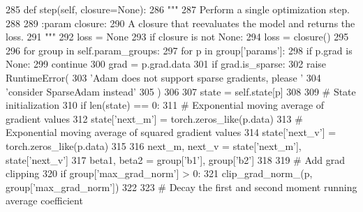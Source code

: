 \begin{DoxyCode}
285     \textcolor{keyword}{def }step(self, closure=None):
286         \textcolor{stringliteral}{"""}
287 \textcolor{stringliteral}{        Perform a single optimization step.}
288 \textcolor{stringliteral}{}
289 \textcolor{stringliteral}{        :param closure:}
290 \textcolor{stringliteral}{            A closure that reevaluates the model and returns the loss.}
291 \textcolor{stringliteral}{        """}
292         loss = \textcolor{keywordtype}{None}
293         \textcolor{keywordflow}{if} closure \textcolor{keywordflow}{is} \textcolor{keywordflow}{not} \textcolor{keywordtype}{None}:
294             loss = closure()
295 
296         \textcolor{keywordflow}{for} group \textcolor{keywordflow}{in} self.param\_groups:
297             \textcolor{keywordflow}{for} p \textcolor{keywordflow}{in} group[\textcolor{stringliteral}{'params'}]:
298                 \textcolor{keywordflow}{if} p.grad \textcolor{keywordflow}{is} \textcolor{keywordtype}{None}:
299                     \textcolor{keywordflow}{continue}
300                 grad = p.grad.data
301                 \textcolor{keywordflow}{if} grad.is\_sparse:
302                     \textcolor{keywordflow}{raise} RuntimeError(
303                         \textcolor{stringliteral}{'Adam does not support sparse gradients, please '}
304                         \textcolor{stringliteral}{'consider SparseAdam instead'}
305                     )
306 
307                 state = self.state[p]
308 
309                 \textcolor{comment}{# State initialization}
310                 \textcolor{keywordflow}{if} len(state) == 0:
311                     \textcolor{comment}{# Exponential moving average of gradient values}
312                     state[\textcolor{stringliteral}{'next\_m'}] = torch.zeros\_like(p.data)
313                     \textcolor{comment}{# Exponential moving average of squared gradient values}
314                     state[\textcolor{stringliteral}{'next\_v'}] = torch.zeros\_like(p.data)
315 
316                 next\_m, next\_v = state[\textcolor{stringliteral}{'next\_m'}], state[\textcolor{stringliteral}{'next\_v'}]
317                 beta1, beta2 = group[\textcolor{stringliteral}{'b1'}], group[\textcolor{stringliteral}{'b2'}]
318 
319                 \textcolor{comment}{# Add grad clipping}
320                 \textcolor{keywordflow}{if} group[\textcolor{stringliteral}{'max\_grad\_norm'}] > 0:
321                     clip\_grad\_norm\_(p, group[\textcolor{stringliteral}{'max\_grad\_norm'}])
322 
323                 \textcolor{comment}{# Decay the first and second moment running average coefficient}

\end{DoxyCode}
